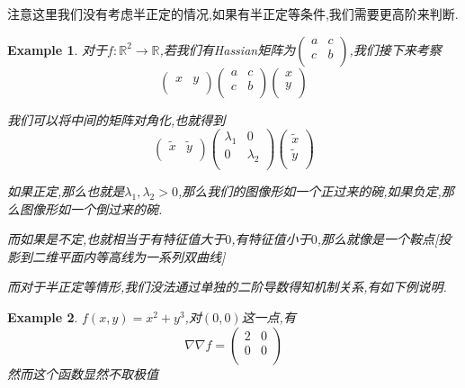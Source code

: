 \documentclass[11pt,hyperref,a4paper,UTF8]{ctexart}
\newtheorem{example}{Example}[subsection]
\newcommand{\RR}{\mathbb{R}}
\begin{document}
\begin{CJK}{UTF8}{gkai}
注意这里我们没有考虑半正定的情况,如果有半正定等条件,我们需要更高阶来判断.

\begin{example}
  对于$f:\RR^2 \to \RR$,若我们有Hassian矩阵为$\begin{pmatrix}
    a&c\\
    c&b\\
  \end{pmatrix}$,我们接下来考察
  \[\begin{pmatrix}
    x&y\\
  \end{pmatrix}\begin{pmatrix}
    a&c\\
    c&b\\
  \end{pmatrix}\begin{pmatrix}
    x\\
    y\\
  \end{pmatrix}\]

  我们可以将中间的矩阵对角化,也就得到
  \[\begin{pmatrix}
    \tilde{x}&\tilde{y}\\
  \end{pmatrix}\begin{pmatrix}
    \lambda_1&0\\
    0&\lambda_2\\
  \end{pmatrix}\begin{pmatrix}
    \tilde{x}\\
    \tilde{y}\\
  \end{pmatrix}\]
  
  如果正定,那么也就是$\lambda_1,\lambda_2 > 0$,那么我们的图像形如一个正过来的碗,如果负定,那么图像形如一个倒过来的碗.

  而如果是不定,也就相当于有特征值大于$0$,有特征值小于$0$,那么就像是一个鞍点[投影到二维平面内等高线为一系列双曲线]

  而对于半正定等情形,我们没法通过单独的二阶导数得知机制关系,有如下例说明.
\end{example}

\begin{example}
  $f(x,y) = x^2 + y^3$,对$(0,0)$这一点,有
  \[\nabla \nabla f = \begin{pmatrix}
    2&0\\
    0&0\\
  \end{pmatrix}\]
  然而这个函数显然不取极值
\end{example}


\end{CJK}
\end{document}

